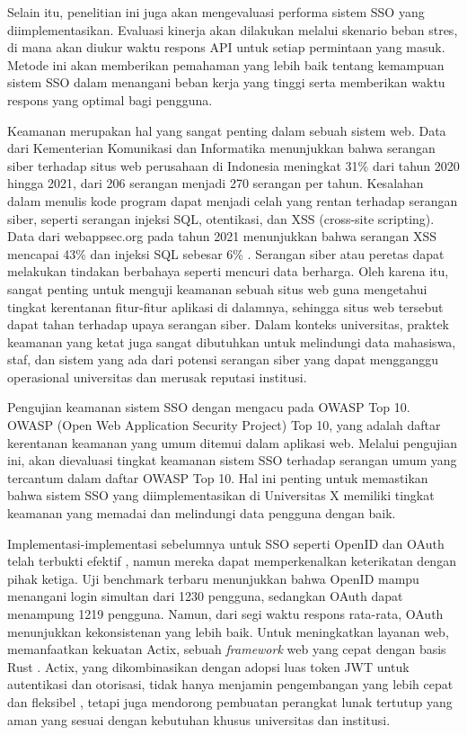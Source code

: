 \documentclass[12pt]{article}
\begin{document}
Selain itu, penelitian ini juga akan mengevaluasi performa sistem SSO yang diimplementasikan. Evaluasi kinerja akan dilakukan melalui skenario beban stres\autocite{ComparativeAnaWaluyo2022}, di mana akan diukur waktu respons API untuk setiap permintaan yang masuk. Metode ini akan memberikan pemahaman yang lebih baik tentang kemampuan sistem SSO dalam menangani beban kerja yang tinggi serta memberikan waktu respons yang optimal bagi pengguna.

Keamanan merupakan hal yang sangat penting dalam sebuah sistem web. Data dari Kementerian Komunikasi dan Informatika menunjukkan bahwa serangan siber terhadap situs web perusahaan di Indonesia meningkat 31\% dari tahun 2020 hingga 2021, dari 206 serangan menjadi 270 serangan per tahun. Kesalahan dalam menulis kode program dapat menjadi celah yang rentan terhadap serangan siber, seperti serangan injeksi SQL, otentikasi, dan XSS (cross-site scripting). Data dari webappsec.org pada tahun 2021 menunjukkan bahwa serangan XSS mencapai 43\% dan injeksi SQL sebesar 6\% . Serangan siber atau peretas dapat melakukan tindakan berbahaya seperti mencuri data berharga. Oleh karena itu, sangat penting untuk menguji keamanan sebuah situs web guna mengetahui tingkat kerentanan fitur-fitur aplikasi di dalamnya, sehingga situs web tersebut dapat tahan terhadap upaya serangan siber. Dalam konteks universitas, praktek keamanan yang ketat juga sangat dibutuhkan untuk melindungi data mahasiswa, staf, dan sistem yang ada dari potensi serangan siber yang dapat mengganggu operasional universitas dan merusak reputasi institusi\autocite{Priyawati2022WebsiteVT}.

Pengujian keamanan sistem SSO dengan mengacu pada OWASP Top 10. OWASP (Open Web Application Security Project) Top 10, yang adalah daftar kerentanan keamanan yang umum ditemui dalam aplikasi web. Melalui pengujian ini, akan dievaluasi tingkat keamanan sistem SSO terhadap serangan umum yang tercantum dalam daftar OWASP Top 10\autocite{Priyawati2022WebsiteVT}. Hal ini penting untuk memastikan bahwa sistem SSO yang diimplementasikan di Universitas X memiliki tingkat keamanan yang memadai dan melindungi data pengguna dengan baik.

Implementasi-implementasi sebelumnya untuk SSO seperti OpenID dan OAuth telah terbukti efektif \autocite{ComparativeAnaWaluyo2022}, namun mereka dapat memperkenalkan keterikatan dengan pihak ketiga. Uji benchmark terbaru menunjukkan bahwa OpenID mampu menangani login simultan dari 1230 pengguna, sedangkan OAuth dapat menampung 1219 pengguna\autocite{ComparativeAnaWaluyo2022}. Namun, dari segi waktu respons rata-rata, OAuth menunjukkan kekonsistenan yang lebih baik. Untuk meningkatkan layanan web, memanfaatkan kekuatan Actix, sebuah \emph{framework} web yang cepat dengan basis Rust\autocite{kyriakou2022complementing} . Actix, yang dikombinasikan dengan adopsi luas token JWT untuk autentikasi dan otorisasi, tidak hanya menjamin pengembangan yang lebih cepat dan fleksibel \autocite{ADynamicFederAlsade2022}, tetapi juga mendorong pembuatan perangkat lunak tertutup yang aman yang sesuai dengan kebutuhan khusus universitas dan institusi.
\end{document}
